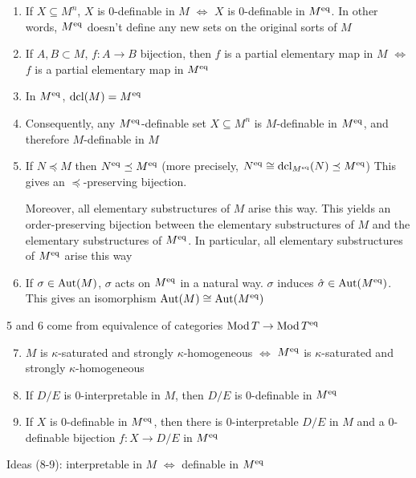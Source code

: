 \documentclass[11pt]{article}
\begin{document}
\begin{fact}[]
\label{4.7.22}
\begin{enumerate}
\item If \(X\subseteq M^n\), \(X\) is 0-definable in \(M\) \(\Leftrightarrow\) \(X\) is 0-definable in \(M^{\operatorname{eq}}\). In
other words, \(M^{\operatorname{eq}}\) doesn't define any new sets on the original sorts of \(M\)
\item If \(A,B\subset M\), \(f:A\to B\) bijection, then \(f\) is a partial elementary map
in \(M\) \(\Leftrightarrow\) \(f\) is a partial elementary map in \(M^{\operatorname{eq}}\)
\item In \(M^{\operatorname{eq}}\), \(\operatorname{dcl}(M)=M^{\operatorname{eq}}\)
\item Consequently, any \(M^{\operatorname{eq}}\)-definable set \(X\subseteq M^n\) is \(M\)-definable in \(M^{\operatorname{eq}}\), and
therefore \(M\)-definable in \(M\)
\item If \(N\preceq M\) then \(N^{\operatorname{eq}}\preceq M^{\operatorname{eq}}\) (more
precisely, \(N^{\operatorname{eq}}\cong\operatorname{dcl}_{M^{\operatorname{eq}}}(N)\preceq M^{\operatorname{eq}}\)) This gives an \(\preceq\)-preserving bijection.

Moreover, all elementary substructures of \(M\) arise this way. This yields an
order-preserving bijection between the elementary substructures of \(M\) and the elementary
substructures of \(M^{\operatorname{eq}}\). In particular, all elementary substructures of \(M^{\operatorname{eq}}\)
arise this way
\item If \(\sigma\in\operatorname{\text{Aut}}(M)\), \(\sigma\) acts on \(M^{\operatorname{eq}}\) in a natural way. \(\sigma\)
induces \(\hat{\sigma}\in\operatorname{\text{Aut}}(M^{\operatorname{eq}})\). This gives an isomorphism \(\operatorname{\text{Aut}}(M)\cong\operatorname{\text{Aut}}(M^{\operatorname{eq}})\)
\end{enumerate}


5 and 6 come from equivalence of categories \(\operatorname{Mod} T\to\operatorname{Mod} T^{\operatorname{eq}}\)
\begin{enumerate}
\setcounter{enumi}{6}
\item \(M\) is \(\kappa\)-saturated and strongly \(\kappa\)-homogeneous \(\Leftrightarrow\) \(M^{\operatorname{eq}}\) is \(\kappa\)-saturated and strongly \(\kappa\)-homogeneous
\item If \(D/E\) is 0-interpretable in \(M\), then \(D/E\) is 0-definable in \(M^{\operatorname{eq}}\)
\item If \(X\) is 0-definable in \(M^{\operatorname{eq}}\), then there is 0-interpretable \(D/E\) in \(M\) and a
0-definable bijection \(f:X\to D/E\) in \(M^{\operatorname{eq}}\)
\end{enumerate}


Ideas (8-9): interpretable in \(M\) \(\Leftrightarrow\) definable in \(M^{\operatorname{eq}}\)
\end{fact}
\end{document}
